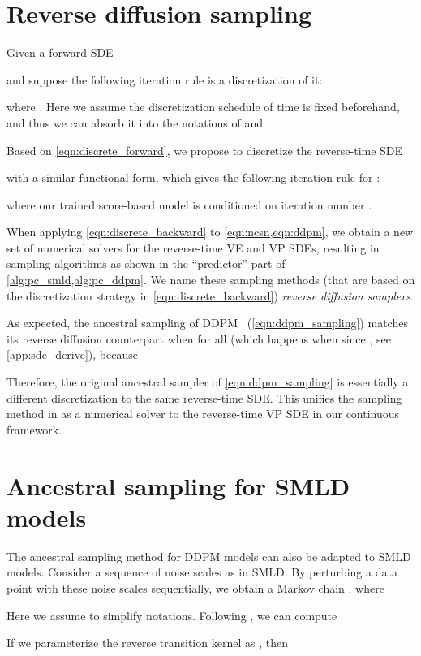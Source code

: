 \documentclass{article} \usepackage{iclr2021_conference,times}
\begin{document}
\section{Reverse diffusion sampling}\label{app:reverse_diffusion}
Given a forward SDE 

and suppose the following iteration rule is a discretization of it:

where . Here we assume the discretization schedule of time is fixed beforehand, and thus we can absorb it into the notations of  and .

Based on \cref{eqn:discrete_forward}, we propose to discretize the reverse-time SDE

with a similar functional form, which gives the following iteration rule for :

where our trained score-based model  is conditioned on iteration number .

When applying \cref{eqn:discrete_backward} to \cref{eqn:ncsn,eqn:ddpm}, we obtain a new set of numerical solvers for the reverse-time VE and VP SDEs, resulting in sampling algorithms as shown in the ``predictor'' part of \cref{alg:pc_smld,alg:pc_ddpm}. We name these sampling methods (that are based on the discretization strategy in \cref{eqn:discrete_backward}) \emph{reverse diffusion samplers}. 

As expected, the ancestral sampling of DDPM~\citep{ho2020denoising} (\cref{eqn:ddpm_sampling}) matches its reverse diffusion counterpart when  for all  (which happens when  since , see \cref{app:sde_derive}), because

Therefore, the original ancestral sampler of \cref{eqn:ddpm_sampling} is essentially a different discretization to the same reverse-time SDE. This unifies the sampling method in \citet{ho2020denoising} as a numerical solver to the reverse-time VP SDE in our continuous framework. 


\section{Ancestral sampling for SMLD models}\label{app:ancestral}
The ancestral sampling method for DDPM models can also be adapted to SMLD models. Consider a sequence of noise scales  as in SMLD. By perturbing a data point  with these noise scales sequentially, we obtain a Markov chain , where

Here we assume  to simplify notations. Following \citet{ho2020denoising}, we can compute

If we parameterize the reverse transition kernel as , then
\end{document}
